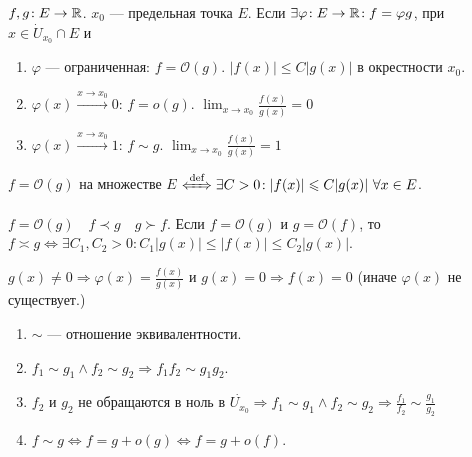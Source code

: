 \begin{definition}
$f, g\!: E \to \mathbb{R}$.  $x_0$ --- предельная точка  $E$. Если $\exists \varphi\!:E \to \mathbb{R}\!: f = \varphi g$, при $x \in \dot{U}_{x_0} \cap E$ и 
     \begin{enumerate}
         \item $\varphi$ --- ограниченная:  $f = \mathcal{O}(g)$. $|f(x)| \le C|g(x)|$ в окрестности $x_0$.
         \item  $\varphi(x) \xrightarrow{x \to x_0} 0$:  $f = o(g)$. $\lim_{x \to x_0} \frac{f(x)}{g(x)} = 0$
         \item  $\varphi(x) \xrightarrow{x \to x_0} 1$:  $f \sim g$. $\lim_{x \to x_0} \frac{f(x)}{g(x)} = 1$
    \end{enumerate}
\end{definition}
\begin{definition}
    $f = \mathcal{O}(g)$ на множестве  $E$  $\xLeftrightarrow{\text{def}} \exists C > 0\!: |f(x)| \le C|g(x)|\ \forall x \in E$.
\end{definition}
\begin{definition}
    $f = \mathcal{O}(g) \quad f \prec g \quad g \succ f$. Если  $f = \mathcal{O}(g)$ и  $g = \mathcal{O}(f)$, то  $f \asymp g \iff \exists C_1, C_2 > 0\!: C_1|g(x)| \le |f(x)| \le C_2|g(x)|$.
\end{definition}
\begin{remark}
    $g(x) \neq 0 \Rightarrow \varphi(x) = \frac{f(x)}{g(x)}$ и $g(x) = 0 \Rightarrow f(x) = 0$ (иначе $\varphi(x)$ не существует.)
\end{remark}
\begin{properties}
    \begin{enumerate}
        \item $\sim$ --- отношение эквивалентности.
        \item  $f_1 \sim g_1 \land f_2 \sim g_2 \Rightarrow f_1f_2 \sim g_1g_2$.
        \item $f_2$ и  $g_2$ не обращаются в ноль в  $\dot{U_{x_0}} \Rightarrow f_1 \sim g_1 \land f_2 \sim g_2 \Rightarrow \frac{f_1}{f_2} \sim \frac{g_1}{g_2}$
        \item $f \sim g \iff f = g + o(g) \iff f = g + o(f)$.
    \end{enumerate}
\end{properties}
